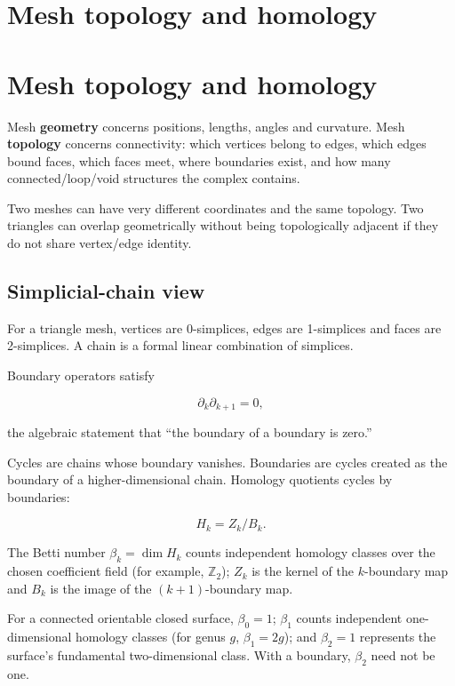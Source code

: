 \hypertarget{appendix-e38976cbbf86}{}
\section*{Mesh topology and homology}
\section{Mesh topology and homology}\label{appendix-e38976cbbf86-mesh-topology-and-homology}

Mesh \textbf{geometry} concerns positions, lengths, angles and curvature. Mesh \textbf{topology} concerns connectivity: which vertices belong to edges, which edges bound faces, which faces meet, where boundaries exist, and how many connected/loop/void structures the complex contains.

Two meshes can have very different coordinates and the same topology. Two triangles can overlap geometrically without being topologically adjacent if they do not share vertex/edge identity.

\subsection{Simplicial-chain view}\label{appendix-e38976cbbf86-simplicial-chain-view}

For a triangle mesh, vertices are 0-simplices, edges are 1-simplices and faces are 2-simplices. A chain is a formal linear combination of simplices.

Boundary operators satisfy

\[
\partial_k\partial_{k+1}=0,
\]

the algebraic statement that ``the boundary of a boundary is zero.''

Cycles are chains whose boundary vanishes. Boundaries are cycles created as the boundary of a higher-dimensional chain. Homology quotients cycles by boundaries:

\[
H_k=Z_k/B_k.
\]

The Betti number \(\beta_k=\dim H_k\) counts independent homology classes over the chosen coefficient field (for example, \(\mathbb{Z}_2\)); \(Z_k\) is the kernel of the \(k\)-boundary map and \(B_k\) is the image of the \((k+1)\)-boundary map.

For a connected orientable closed surface, \(\beta_0=1\); \(\beta_1\) counts independent one-dimensional homology classes (for genus \(g\), \(\beta_1=2g\)); and \(\beta_2=1\) represents the surface's fundamental two-dimensional class. With a boundary, \(\beta_2\) need not be one.

